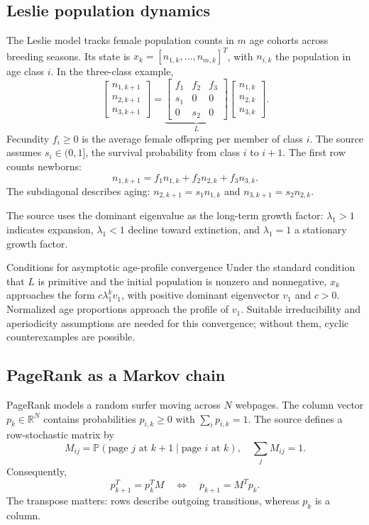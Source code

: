 \documentclass[11pt,a4paper]{article}
\numberwithin{equation}{section}
\numberwithin{figure}{section}
\numberwithin{table}{section}
\newcommand{\R}{\mathbb{R}}
\begin{document}
\subsection{Leslie population dynamics}
The Leslie model tracks female population counts in $m$ age cohorts across breeding seasons. Its state is $x_k=[n_{1,k},\ldots,n_{m,k}]^T$, with $n_{i,k}$ the population in age class $i$. In the three-class example,
\begin{equation}\label{eq:leslie}
\begin{bmatrix}n_{1,k+1}\\n_{2,k+1}\\n_{3,k+1}\end{bmatrix}
=\underbrace{\begin{bmatrix}f_1&f_2&f_3\\s_1&0&0\\0&s_2&0\end{bmatrix}}_{L}
\begin{bmatrix}n_{1,k}\\n_{2,k}\\n_{3,k}\end{bmatrix}.
\end{equation}
Fecundity $f_i\ge0$ is the average female offspring per member of class $i$. The source assumes $s_i\in(0,1]$, the survival probability from class $i$ to $i+1$. The first row counts newborns:
\[n_{1,k+1}=f_1n_{1,k}+f_2n_{2,k}+f_3n_{3,k}.\]
The subdiagonal describes aging: $n_{2,k+1}=s_1n_{1,k}$ and $n_{3,k+1}=s_2n_{2,k}$.

The source uses the dominant eigenvalue as the long-term growth factor: $\lambda_1>1$ indicates expansion, $\lambda_1<1$ decline toward extinction, and $\lambda_1=1$ a stationary growth factor.

\begin{supplementary}{Conditions for asymptotic age-profile convergence}
Under the standard condition that $L$ is primitive and the initial population is nonzero and nonnegative, $x_k$ approaches the form $c\lambda_1^kv_1$, with positive dominant eigenvector $v_1$ and $c>0$. Normalized age proportions approach the profile of $v_1$. Suitable irreducibility and aperiodicity assumptions are needed for this convergence; without them, cyclic counterexamples are possible.
\end{supplementary}

\subsection{PageRank as a Markov chain}
PageRank models a random surfer moving across $N$ webpages. The column vector $p_k\in\R^N$ contains probabilities $p_{i,k}\ge0$ with $\sum_i p_{i,k}=1$. The source defines a row-stochastic matrix by
\[M_{ij}=\mathbb P(\text{page }j\text{ at }k+1\mid\text{page }i\text{ at }k),\quad\sum_jM_{ij}=1.\]
Consequently,
\begin{equation}p_{k+1}^T=p_k^TM\quad\Longleftrightarrow\quad p_{k+1}=M^Tp_k.\end{equation}
The transpose matters: rows describe outgoing transitions, whereas $p_k$ is a column.
\end{document}
